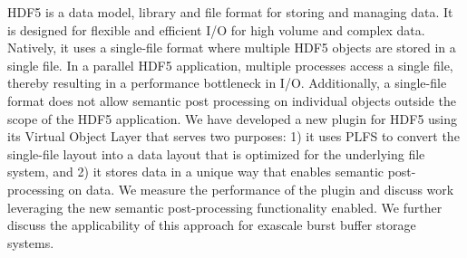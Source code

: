 HDF5 is a data model, library and file format for storing and managing data. It is designed for flexible and efficient I/O for high volume and complex data. Natively, it uses a single-file format where multiple HDF5 objects are stored in a single file. In a parallel HDF5 application, multiple processes access a single file, thereby resulting in a performance bottleneck in I/O. Additionally, a single-file format does not allow semantic post processing on individual objects outside the scope of the HDF5 application. We have developed a new plugin for HDF5 using its Virtual Object Layer that serves two purposes: 1) it uses PLFS to convert the single-file layout into a data layout that is optimized for the underlying file system, and 2) it stores data in a unique way that enables semantic post-processing on data. We measure the performance of the plugin and discuss work leveraging the new semantic post-processing functionality enabled.  We further discuss the applicability of this approach for exascale burst buffer storage systems.
